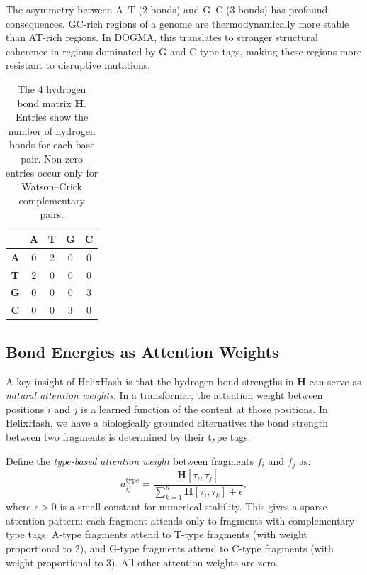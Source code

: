 \begin{remark}
The asymmetry between A--T (2 bonds) and G--C (3 bonds) has profound consequences. GC-rich regions of a genome are thermodynamically more stable than AT-rich regions. In DOGMA, this translates to stronger structural coherence in regions dominated by G and C type tags, making these regions more resistant to disruptive mutations.
\end{remark}

\begin{table}[H]
\centering
\caption{The 4 hydrogen bond matrix $\mathbf{H}$. Entries show the number of hydrogen bonds for each base pair. Non-zero entries occur only for Watson--Crick complementary pairs.}
\label{tab:bond-matrix}
\begin{tabular}{c|cccc}
\toprule
 & \textbf{A} & \textbf{T} & \textbf{G} & \textbf{C} \\
\midrule
\textbf{A} & 0 & 2 & 0 & 0 \\
\textbf{T} & 2 & 0 & 0 & 0 \\
\textbf{G} & 0 & 0 & 0 & 3 \\
\textbf{C} & 0 & 0 & 3 & 0 \\
\bottomrule
\end{tabular}
\end{table}

\subsection{Bond Energies as Attention Weights}
\label{subsec:bond-attention}

A key insight of HelixHash is that the hydrogen bond strengths in $\mathbf{H}$ can serve as \emph{natural attention weights}. In a transformer, the attention weight between positions $i$ and $j$ is a learned function of the content at those positions. In HelixHash, we have a biologically grounded alternative: the bond strength between two fragments is determined by their type tags.

Define the \emph{type-based attention weight} between fragments $f_i$ and $f_j$ as:
\begin{equation}
a_{ij}^{\text{type}} = \frac{\mathbf{H}[\tau_i, \tau_j]}{\sum_{k=1}^{n} \mathbf{H}[\tau_i, \tau_k] + \epsilon},
\label{eq:type-attention}
\end{equation}
where $\epsilon > 0$ is a small constant for numerical stability. This gives a sparse attention pattern: each fragment attends only to fragments with complementary type tags. A-type fragments attend to T-type fragments (with weight proportional to 2), and G-type fragments attend to C-type fragments (with weight proportional to 3). All other attention weights are zero.

